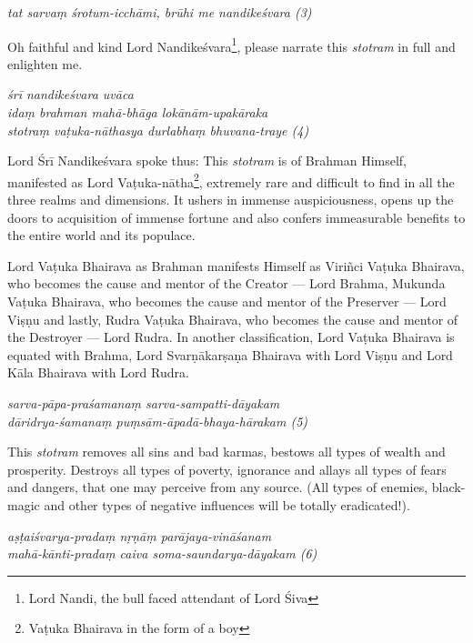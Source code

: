 \documentclass[12pt,oneside,a4paper]{article}
\newenvironment{shloka}[1]
  {\bigskip\center#1\varwidth{\linewidth}}
  {\endvarwidth\endcenter\bigskip}
\newcommand{\tl}[1]{\emph{#1}}
\begin{document}
\begin{shloka}\itshape
  tat sarvaṃ śrotum-icchāmi, brūhi me nandikeśvara (3)
\end{shloka}

Oh faithful and kind Lord Nandikeśvara\footnote{Lord Nandi, the bull faced
attendant of Lord Śiva}, please narrate this \tl{stotram} in full and
enlighten me.

\begin{shloka}\itshape
  śrī nandikeśvara uvāca\\
  idaṃ brahman mahā-bhāga lokānām-upakāraka\\
  stotraṃ vaṭuka-nāthasya durlabhaṃ bhuvana-traye (4)
\end{shloka}

Lord Śrī Nandikeśvara spoke thus: This \tl{stotram} is of Brahman Himself,
manifested as Lord Vaṭuka-nātha\footnote{Vaṭuka Bhairava in the form of a boy},
extremely rare and difficult to find in all the three realms and dimensions.
It ushers in immense auspiciousness, opens up the doors to acquisition of
immense fortune and also confers immeasurable benefits to the entire world and
its populace.

Lord Vaṭuka Bhairava as Brahman manifests Himself as Viriñci Vaṭuka Bhairava,
who becomes the cause and mentor of the Creator — Lord Brahma, Mukunda Vaṭuka
Bhairava, who becomes the cause and mentor of the Preserver — Lord Viṣṇu and
lastly, Rudra Vaṭuka Bhairava, who becomes the cause and mentor of the Destroyer
— Lord Rudra. In another classification, Lord Vaṭuka Bhairava is equated with
Brahma, Lord Svarṇākarṣaṇa Bhairava with Lord Viṣṇu and Lord Kāla Bhairava with
Lord Rudra.

\begin{shloka}\itshape
  sarva-pāpa-praśamanaṃ sarva-sampatti-dāyakam\\
  dāridrya-śamanaṃ puṃsām-āpadā-bhaya-hārakam (5)
\end{shloka}

This \tl{stotram} removes all sins and bad karmas, bestows all types of wealth
and prosperity. Destroys all types of poverty, ignorance and allays all types
of fears and dangers, that one may perceive from any source. (All types of
enemies, black-magic and other types of negative influences will be totally
eradicated!).

\begin{shloka}\itshape
  aṣṭaiśvarya-pradaṃ nṛṇāṃ parājaya-vināśanam\\
  mahā-kānti-pradaṃ caiva soma-saundarya-dāyakam (6)
\end{shloka}
\end{document}

